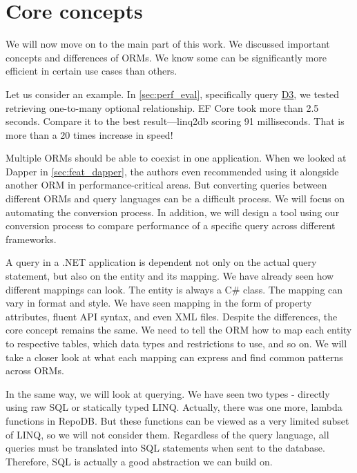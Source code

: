 \chapter{Core concepts}


We will now move on to the main part of this work. We discussed important concepts and differences of ORMs. We know some can be significantly more efficient in certain use cases than others. 

Let us consider an example. In \autoref{sec:perf_eval}, specifically query \hyperref[query:d3]{D3}, we tested retrieving one-to-many optional relationship.
EF Core took more than 2.5 seconds. Compare it to the best result---linq2db scoring 91 milliseconds. That is more than a 20 times increase in speed! 

Multiple ORMs should be able to coexist in one application. When we looked at Dapper in \autoref{sec:feat_dapper}, the authors even recommended using it alongside another ORM in performance-critical areas. But converting queries between different ORMs and query languages can be a difficult process. We will focus on automating the conversion process. In addition, we will design a tool using our conversion process to compare performance of a specific query across different frameworks.


A query in a .NET application is dependent not only on the actual query statement, but also on the entity and its mapping. We have already seen how different mappings can look. The entity is always a C\# class. The mapping can vary in format and style. We have seen mapping in the form of property attributes, fluent API syntax, and even XML files. Despite the differences, the core concept remains the same. We need to tell the ORM how to map each entity to respective tables, which data types and restrictions to use, and so on. We will take a closer look at what each mapping can express and find common patterns across ORMs. 

In the same way, we will look at querying. We have seen two types - directly using raw SQL or statically typed LINQ. Actually, there was one more, lambda functions in RepoDB. But these functions can be viewed as a very limited subset of LINQ, so we will not consider them. Regardless of the query language, all queries must be translated into SQL statements when sent to the database. Therefore, SQL is actually a good abstraction we can build on.


